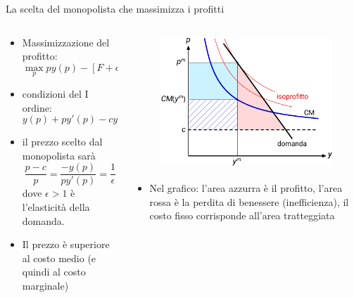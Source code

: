\documentclass[aspectratio=64,11pt]{beamer}
\begin{document}
\begin{frame}{La scelta del monopolista che massimizza i profitti}
\begin{columns}
\begin{column}{.45\columnwidth}
\begin{itemize}
\item Massimizzazione del profitto:
\begin{equation*}
\max_{p} py(p)-[F+cy(p)]
\end{equation*}
\item condizioni del I ordine:
\begin{equation*}
y(p) + py'(p) - cy'(p)=0
\end{equation*}
\item il prezzo scelto dal monopolista sarà
\begin{equation*}
\frac{p-c}{p}=\frac{-y(p)}{py'(p)}=\frac{1}{\epsilon}
\end{equation*}
dove $\epsilon>1$ è l'elasticità della domanda.
\item Il prezzo è superiore al costo medio (e quindi al
costo marginale)
\end{itemize}
\end{column}

\begin{column}{.55\columnwidth}
\begin{figure}[htbp]
\centering
\includegraphics[height=5cm]{./figure/monopolio-naturale-2-color.pdf}
\end{figure}

\begin{itemize}
\item Nel grafico: l'area azzurra è il profitto, l'area rossa è la perdita di benessere (inefficienza), il costo fisso corrisponde all'area tratteggiata
\end{itemize}
\end{column}
\end{columns}
\end{frame}
\end{document}
